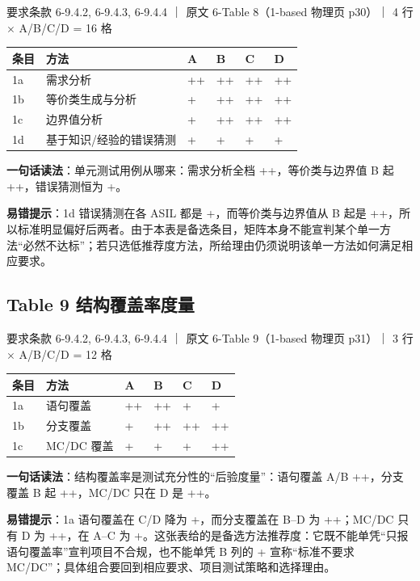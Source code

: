 要求条款 6-9.4.2, 6-9.4.3, 6-9.4.4 ｜ 原文 6-Table 8（1-based 物理页 p30）｜ 4 行 \(\times\) A/B/C/D = 16 格

\begin{center}
\begingroup\small
\setlength{\tabcolsep}{4pt}
\begin{tabularx}{\linewidth}{@{}XXXXXX@{}}
\toprule
条目 & 方法 & A & B & C & D \\
\midrule
1a & 需求分析 & ++ & ++ & ++ & ++ \\
1b & 等价类生成与分析 & + & ++ & ++ & ++ \\
1c & 边界值分析 & + & ++ & ++ & ++ \\
1d & 基于知识/经验的错误猜测 & + & + & + & + \\
\bottomrule
\end{tabularx}
\endgroup
\end{center}

\textbf{一句话读法}：单元测试用例从哪来：需求分析全档 ++，等价类与边界值 B 起 ++，错误猜测恒为 +。

\textbf{易错提示}：1d 错误猜测在各 ASIL 都是 +，而等价类与边界值从 B 起是 ++，所以标准明显偏好后两者。由于本表是备选条目，矩阵本身不能宣判某个单一方法“必然不达标”；若只选低推荐度方法，所给理由仍须说明该单一方法如何满足相应要求。

\subsection{Table 9 结构覆盖率度量}

要求条款 6-9.4.2, 6-9.4.3, 6-9.4.4 ｜ 原文 6-Table 9（1-based 物理页 p31）｜ 3 行 \(\times\) A/B/C/D = 12 格

\begin{center}
\begingroup\small
\setlength{\tabcolsep}{4pt}
\begin{tabularx}{\linewidth}{@{}XXXXXX@{}}
\toprule
条目 & 方法 & A & B & C & D \\
\midrule
1a & 语句覆盖 & ++ & ++ & + & + \\
1b & 分支覆盖 & + & ++ & ++ & ++ \\
1c & MC/DC 覆盖 & + & + & + & ++ \\
\bottomrule
\end{tabularx}
\endgroup
\end{center}

\textbf{一句话读法}：结构覆盖率是测试充分性的“后验度量”：语句覆盖 A/B ++，分支覆盖 B 起 ++，MC/DC 只在 D 是 ++。

\textbf{易错提示}：1a 语句覆盖在 C/D 降为 +，而分支覆盖在 B–D 为 ++；MC/DC 只有 D 为 ++，在 A–C 为 +。这张表给的是备选方法推荐度：它既不能单凭“只报语句覆盖率”宣判项目不合规，也不能单凭 B 列的 + 宣称“标准不要求 MC/DC”；具体组合要回到相应要求、项目测试策略和选择理由。

